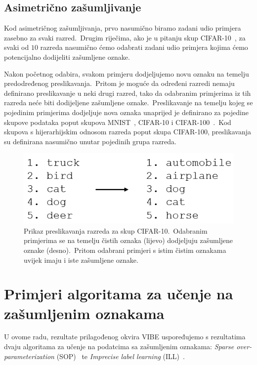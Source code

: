 \documentclass[diplomskirad]{fer}
\begin{document}
\subsection{Asimetrično zašumljivanje}
\label{sub:asym}

Kod asimetričnog zašumljivanja, prvo nasumično biramo zadani udio primjera zasebno za svaki razred.\ 
Drugim riječima, ako je u pitanju skup CIFAR-10~\cite{krizhevsky2009learning}, za svaki od $10$ razreda nasumično ćemo odabrati zadani udio primjera kojima ćemo potencijalno dodijeliti zašumljene oznake.\ 

Nakon početnog odabira, svakom primjeru dodjeljujemo novu oznaku na temelju predodređenog preslikavanja.\ 
Pritom je moguće da određeni razredi nemaju definirano preslikavanje u neki drugi razred, tako da odabranim primjerima iz tih razreda neće biti dodijeljene zašumljene oznake.\ 
Preslikavanje na temelju kojeg se pojedinim primjerima dodjeljuje nova oznaka unaprijed je definirano za pojedine skupove podataka poput skupova MNIST~\cite{deng2012mnist}, CIFAR-10 i CIFAR-100~\cite{krizhevsky2009learning}.\ 
Kod skupova s hijerarhijskim odnosom razreda poput skupa CIFAR-100, preslikavanja su definirana nasumično unutar pojedinih grupa razreda.\ 

\begin{figure}[h]
  \centering
  \includegraphics[scale=0.7]{./Slike/asym.png}
  \caption{Prikaz preslikavanja razreda za skup CIFAR-10.\ Odabranim primjerima se na temelju čistih oznaka (lijevo) dodjeljuju zašumljene oznake (desno).\ Pritom odabrani primjeri s istim čistim oznakama uvijek imaju i iste zašumljene oznake.}
  \label{fig:asym}
\end{figure}

\pagebreak

\section{Primjeri algoritama za učenje na zašumljenim oznakama}
\label{sek:primjeri_obrana_zasumljivanje}

U ovome radu, rezultate prilagođenog okvira VIBE uspoređujemo s rezultatima dvaju algoritama za učenje na podatcima sa zašumljenim oznakama: \textit{Sparse over-parameterization} (SOP)~\cite{liu2022robust} te \textit{Imprecise label learning} (ILL)~\cite{chen2024imprecise}.\ 
\end{document}
